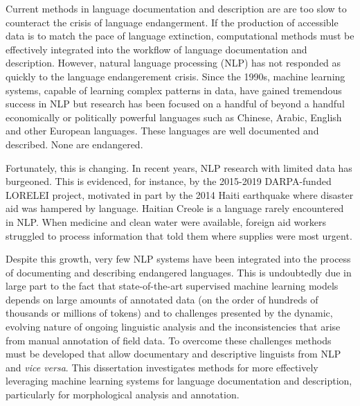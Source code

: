 Current methods in language documentation and description are
are too slow to counteract the crisis of language endangerment.
If the production of accessible data is to match the pace of language extinction, computational methods must be effectively integrated into the workflow of language documentation and description. However, natural language processing (NLP) has not responded as quickly to the language endangerement crisis. Since the 1990s, machine learning systems, capable of learning complex patterns in data, have gained tremendous success in NLP
but research has been focused on a handful of beyond a handful economically or politically powerful languages such as Chinese, Arabic, English and other European languages. These languages are well documented and described. None 
are endangered.%

Fortunately, this is changing. In recent years, NLP research with limited data has burgeoned. This is evidenced, for instance, by the 2015-2019 DARPA-funded LORELEI project, motivated in part by the 2014 Haiti earthquake where disaster aid was hampered by language. Haitian Creole is a language rarely encountered in NLP. When medicine and clean water were available, foreign aid workers struggled to process information that told them where supplies were most urgent. 

Despite this growth, very few NLP systems have been integrated into the process of documenting and describing endangered languages. This is undoubtedly due in large part to the fact that state-of-the-art supervised machine learning models depends on large amounts of annotated data (on the order of hundreds of thousands or millions of tokens) and to challenges presented by the dynamic, evolving nature of ongoing linguistic analysis and the inconsistencies that arise from manual annotation of field data. To overcome these challenges methods must be developed that allow documentary and descriptive linguists from NLP and \textit{vice versa}.
This dissertation investigates methods for more effectively leveraging machine learning systems for language documentation and description, particularly for morphological analysis and annotation. 


